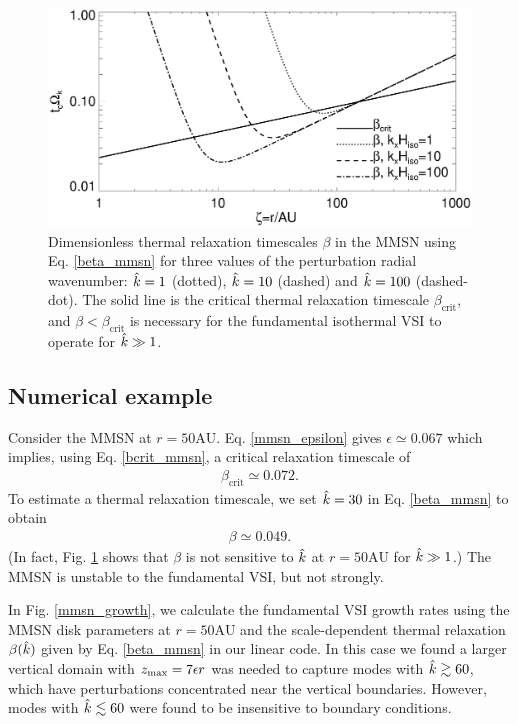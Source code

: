\begin{figure}
  \includegraphics[width=\linewidth]{figures/bcrit_mmsn}  
  \caption{Dimensionless thermal relaxation timescales $\beta$ in the MMSN
    using Eq. \ref{beta_mmsn} for three values of the 
    perturbation radial wavenumber: $\hat{k}=1$ (dotted), $\hat{k}=10$
    (dashed) and $\hat{k}=100$ (dashed-dot). The solid line is the
    critical thermal relaxation timescale $\beta_\mathrm{crit}$, and 
    $\beta<\beta_\mathrm{crit}$
    is necessary for the fundamental isothermal VSI to operate  
    for $\hat{k}\gg1$. 
    \label{mmsn_bcrit_bcool}}   
\end{figure}  

\subsection{Numerical example}\label{mmsn_example}
Consider  the MMSN at $r=50\mathrm{AU}$. Eq. \ref{mmsn_epsilon} gives
$\epsilon \simeq 
0.067$ which implies, using Eq. \ref{bcrit_mmsn}, a critical 
relaxation timescale of  
\begin{align*}
  \beta_\mathrm{crit} \simeq 0.072. 
\end{align*} 
To estimate a thermal relaxation timescale, we set $\hat{k}=30$ 
in Eq. \ref{beta_mmsn} to obtain 
\begin{align*}
  \beta \simeq 0.049.
\end{align*}
(In fact, Fig. \ref{mmsn_bcrit_bcool} shows that $\beta$  is not
sensitive to $\hat{k}$ at $r=50\mathrm{AU}$ for $\hat{k}\gg1$.)
The MMSN is unstable to the fundamental VSI, but not
strongly. 

In Fig. \ref{mmsn_growth}, we calculate the fundamental
VSI growth rates using the MMSN disk parameters at $r=50\mathrm{AU}$
and the scale-dependent thermal relaxation $\beta(\hat{k})$ given by
Eq. \ref{beta_mmsn} in our linear code.  In this case we found a 
larger vertical domain with $z_\mathrm{max}=7\epsilon r$ was needed to capture
modes with $\hat{k}\gtrsim60$, which have perturbations
concentrated near the vertical boundaries. However, modes with
$\hat{k}\lesssim 60$ were found to be insensitive to boundary
conditions. 

